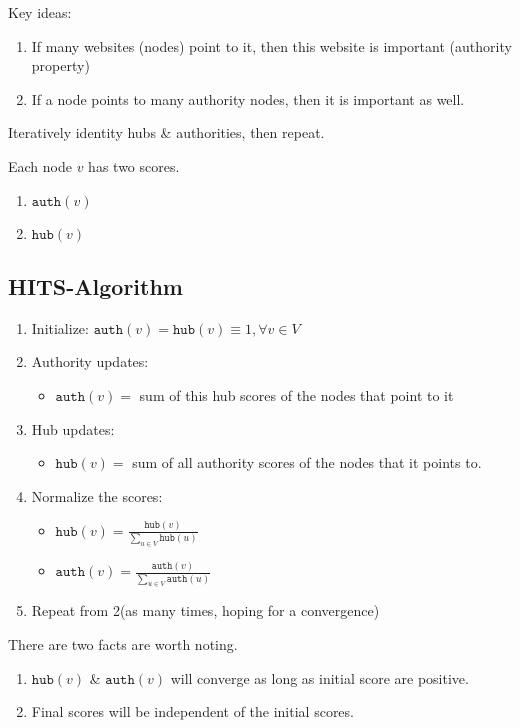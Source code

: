 Key ideas:
\begin{enumerate}
	\item If many websites (nodes) point to it, then this website is important (authority property)
	\item If a node points to many authority nodes, then it is important as well.
\end{enumerate}

Iteratively identity hubs \& authorities, then repeat.

Each node \(v\) has two scores.
\begin{enumerate}
	\item \(\texttt{auth}(v)\)
	\item \(\texttt{hub}(v)\)
\end{enumerate}

\subsection{HITS-Algorithm}
\begin{enumerate}
	\item Initialize: \(\texttt{auth}(v) = \texttt{hub}(v) \equiv 1, \forall v\in V\)
	\item Authority updates:
	      \begin{itemize}
		      \item \(\texttt{auth}(v) = \) sum of this hub scores of the nodes that point to it
	      \end{itemize}
	\item Hub updates:
	      \begin{itemize}
		      \item \(\texttt{hub}(v) = \) sum of all authority scores of the nodes that it points to.
	      \end{itemize}
	\item Normalize the scores:
	      \begin{itemize}
		      \item \(\texttt{hub}(v) = \frac{\texttt{hub}(v)}{\sum\limits_{u\in V} \texttt{hub}(u) }\)
		      \item \(\texttt{auth}(v) = \frac{\texttt{auth}(v)}{\sum\limits_{u\in V} \texttt{auth}(u) }\)
	      \end{itemize}
	\item Repeat from 2(as many times, hoping for a convergence)
\end{enumerate}

\begin{note}
	There are two facts are worth noting.
	\begin{enumerate}
		\item \(\texttt{hub}(v)\) \& \(\texttt{auth}(v)\) will converge as long as initial score are positive.
		\item Final scores will be independent of the initial scores.
	\end{enumerate}
\end{note}
